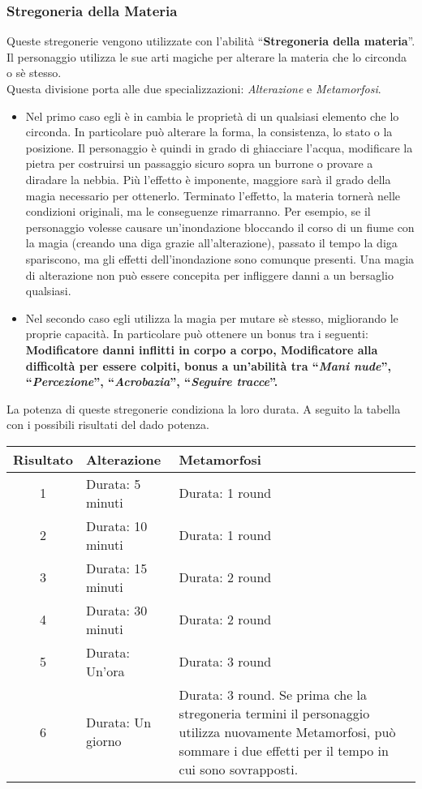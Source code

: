\documentclass[../manuale_main.tex]{subfiles}
\begin{document}
\subsubsection{Stregoneria della Materia}
Queste stregonerie vengono utilizzate con l'abilità ``\textbf{Stregoneria della materia}''.\\
Il personaggio utilizza le sue arti magiche per alterare la materia che lo circonda o sè stesso. \\
Questa divisione porta alle due specializzazioni: \emph{Alterazione} e \emph{Metamorfosi}.\\
\begin{itemize}
\item Nel primo caso egli è in cambia le proprietà di un qualsiasi elemento che lo circonda. In particolare può alterare la forma, la consistenza, lo stato o la posizione. Il personaggio è quindi in grado di ghiacciare l'acqua, modificare la pietra per costruirsi un passaggio sicuro sopra un burrone o provare a diradare la nebbia. Più l'effetto è imponente, maggiore sarà il grado della magia necessario per ottenerlo. Terminato l'effetto, la materia tornerà nelle condizioni originali, ma le conseguenze rimarranno. Per esempio, se il personaggio volesse causare un'inondazione bloccando il corso di un fiume con la magia (creando una diga grazie all'alterazione), passato il tempo la diga spariscono, ma gli effetti dell'inondazione sono comunque presenti. Una magia di alterazione non può essere concepita per infliggere danni a un bersaglio qualsiasi.
\item Nel secondo caso egli utilizza la magia per mutare sè stesso, migliorando le proprie capacità. In particolare può ottenere un bonus tra i seguenti: \textbf{Modificatore danni inflitti in corpo a corpo, Modificatore alla difficoltà per essere colpiti, bonus a un'abilità tra ``\emph{Mani nude}'', ``\emph{Percezione}'', ``\emph{Acrobazia}'', ``\emph{Seguire tracce}''.}
\end{itemize}
La potenza di queste stregonerie condiziona la loro durata. A seguito la tabella con i possibili risultati del dado potenza.\\

\begin{tabularx}{\linewidth}{|c |X| X|}
\hline
\textbf{Risultato}&\textbf{Alterazione}&\textbf{Metamorfosi}\\ \hline
1&Durata: 5 minuti&Durata: 1 round\\ \hline
2&Durata: 10 minuti&Durata: 1 round\\ \hline
3&Durata: 15 minuti&Durata: 2 round\\ \hline
4&Durata: 30 minuti&Durata: 2 round\\ \hline
5&Durata: Un'ora&Durata: 3 round\\ \hline
6&Durata: Un giorno&Durata: 3 round. Se prima che la stregoneria termini il personaggio utilizza nuovamente Metamorfosi, può sommare i due effetti per il tempo in cui sono sovrapposti.\\ \hline
\end{tabularx}
\end{document}

